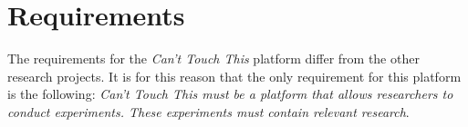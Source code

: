 \documentclass[a4paper]{article}
\begin{document}
  \section{Requirements}
  The requirements for the \textit{Can't Touch This} platform differ from the
  other research projects. It is for this reason that the only requirement for
  this platform is the following: \textit{Can't Touch This must be a platform
  that allows researchers to conduct experiments. These experiments must contain
  relevant research}.
  \clearpage



\end{document}
